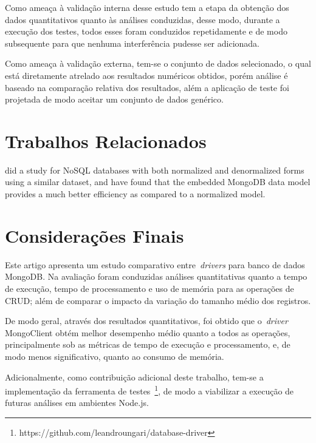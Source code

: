 \documentclass[12pt]{article}
\begin{document}
Como ameaça à validação interna desse estudo tem a etapa da obtenção dos dados quantitativos quanto às análises conduzidas, desse modo, durante a execução dos testes, todos esses foram conduzidos repetidamente e de modo subsequente para que nenhuma interferência pudesse ser adicionada.

Como ameaça à validação externa, tem-se o conjunto de dados selecionado, o qual está diretamente atrelado aos resultados numéricos obtidos, porém análise é baseado na comparação relativa dos resultados, além a aplicação de teste foi projetada de modo aceitar um conjunto de dados genérico.

\section{Trabalhos Relacionados} 
\label{section:relacionados}

\cite{kanade2014study} did a study for NoSQL databases with both normalized and denormalized forms using a similar dataset, and have found that the embedded MongoDB
data model provides a much better efficiency as compared to a normalized model. 


\section{Considerações Finais}
\label{section:consideracoes}

Este artigo apresenta um estudo comparativo entre~\emph{drivers} para banco de dados MongoDB.
Na avaliação foram conduzidas análises quantitativas quanto a tempo de execução, tempo de processamento e uso de memória para as operações de CRUD; além de comparar o impacto da variação do tamanho médio dos registros.

De modo geral, através dos resultados quantitativos, foi obtido que o~\emph{driver} MongoClient obtém melhor desempenho médio quanto a todos as operações, principalmente sob as métricas de tempo de execução e processamento, e, de modo menos significativo, quanto ao consumo de memória.

Adicionalmente, como contribuição adicional deste trabalho, tem-se a implementação da ferramenta de  testes~\footnote{https://github.com/leandroungari/database-driver}, de modo a viabilizar a execução de futuras análises em ambientes Node.js.




\end{document}
